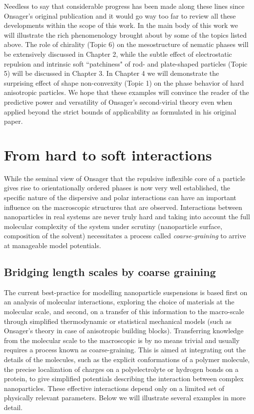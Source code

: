 \documentclass[amssymb]{revtex4}
\begin{document}
\noindent Needless to say that considerable progress has been made along these lines since Onsager's original publication and it would go way too far to review all these developments within the scope of this work. In the main body of this work we will illustrate the rich phenomenology brought about by some of the topics listed above.   The role of chirality (Topic 6) on the mesostructure of nematic phases will be extensively discussed in Chapter 2, while the subtle effect of electrostatic repulsion and intrinsic soft ``patchiness" of rod- and plate-shaped particles (Topic 5) will be discussed in Chapter 3. In Chapter 4 we will demonstrate the surprising effect of shape non-convexity (Topic 1) on the phase behavior of hard anisotropic particles. We hope that these examples will convince the reader of the predictive power and versatility of Onsager's second-virial theory even when applied beyond the strict bounds of applicability as formulated in his original paper.


\section{From hard to soft interactions}


While the seminal view of Onsager that the repulsive inflexible core of a particle gives rise to orientationally ordered phases is now very well established, the specific nature of the dispersive and polar interactions can have an important influence on the macroscopic structures that are observed. 
Interactions between nanoparticles in real systems are never truly hard and taking into account the full molecular complexity of the system under scrutiny (nanoparticle surface, composition of the solvent) necessitates a process called {\em coarse-graining} to arrive at manageable model potentials.   

\subsection{Bridging length scales by coarse graining} 

The current best-practice for modelling nanoparticle suspensions is based first on an analysis of molecular interactions, exploring the choice of materials at the molecular scale, and second, on a transfer of this information to the macro-scale through simplified thermodynamic or statistical mechanical models (such as Onsager's theory in case of anisotropic building blocks).
Transferring knowledge from the molecular scale to the macroscopic is  by no means trivial and usually requires a process known as coarse-graining. This is aimed at integrating out the details of the molecules, such as the explicit conformations of a polymer molecule, the precise localization of charges on a polyelectrolyte or hydrogen bonds on a protein, to give simplified potentials describing the interaction between complex nanoparticles. These effective interactions depend only on a limited set of physically relevant parameters. 
Below we will illustrate several examples in more detail. 
\end{document}
